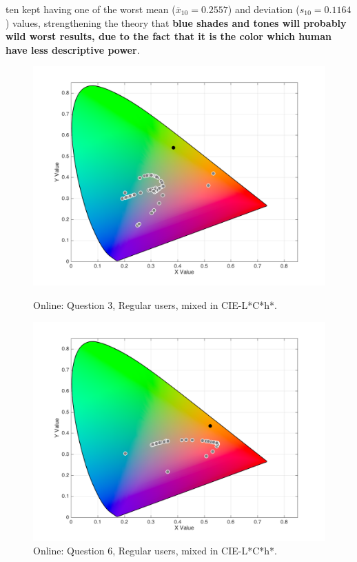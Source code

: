 ten kept having one of the worst mean ($\overline{x}_{10} = 0.2557$) and deviation ($s_{10} = 0.1164$) values, strengthening the theory that \textbf{blue shades and tones will probably wild worst results, due to the fact
that it is the color which human have less descriptive power}. \par
%
\begin{figure}[!htbp]
  \centering
  \vspace{-10pt}
  \begin{minipage}{0.4\textwidth}
    \centering
    \includegraphics[width=\textwidth]{images/results/3_online_LChresponses.png}
    \caption[Online: Answers for Question 3, from regular users, mixed in CIE-L*C*h* Color Model.]{Online: Question 3, Regular users, mixed in CIE-L*C*h*.}
    \label{fig:onlinelchregular_3}
  \end{minipage}
  \begin{minipage}{0.4\textwidth}
    \centering
    \includegraphics[width=\textwidth]{images/results/6_online_LChresponses.png}
    \caption[Online: Answers for Question 6, from regular users, mixed in CIE-L*C*h* Color Model.]{Online: Question 6, Regular users, mixed in CIE-L*C*h*.}
    \label{fig:onlinelchregular_6}
  \end{minipage}
  \vspace{-5pt}
\end{figure}
